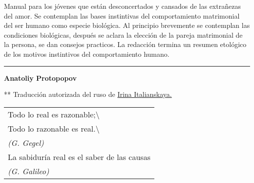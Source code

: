 
Manual para los jóvenes que están desconcertados y cansados de las
extrañezas del amor. Se contemplan las bases instintivas del
comportamiento matrimonial del ser humano como especie biológica. Al principio brevemente se contemplan las condiciones biológicas,  después se aclara la elección de la pareja matrimonial de la persona, se dan consejos practicos. La redacción termina un resumen etológico de los motivos instintivos del comportamiento humano.


\begin{center}\rule{0.5\linewidth}{\linethickness}\end{center}

\textbf{Anatoliy Protopopov}



** Traducción autorizada del ruso de
\href{mailto:isabel@nubimar.com}{Irina Italianskaya.}

\begin{longtable}[]{@{}l@{}}
\toprule
Todo lo real es razonable;\textbackslash{}\tabularnewline
Todo lo razonable es real.\textbackslash{}\tabularnewline
\emph{(G. Gegel)}\tabularnewline
La sabiduría real es el saber de las causas\tabularnewline
\emph{(G. Galileo)}\tabularnewline
\bottomrule
\end{longtable}

